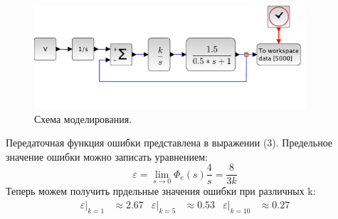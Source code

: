 \documentclass[a3paper, 11pt]{article}
\begin{document}
\begin{minipage}[t]{0.5\textwidth}
    \begin{figure}[H]
        \centering
        \includegraphics[width = 0.9\textwidth]{images/model2-2.pdf}
        \caption{Схема моделирования.}
    \end{figure}
\end{minipage}
\begin{minipage}[t]{0.5\textwidth}
    \vspace{0.5cm}
    Передаточная функция ошибки представлена в выражении (3).
    Предельное значение ошибки можно записать уравнением:
    \begin{equation}
        \varepsilon = \lim_{s\rightarrow 0}{\Phi_e(s)\frac{4}{s}} = \frac{8}{3k}
    \end{equation}
    Теперь можем получить прдельные значения ошибки при различных k:
    \begin{align*}
        \varepsilon|_{k = 1} & \approx 2.67 & \varepsilon|_{k = 5} & \approx 0.53 & \varepsilon|_{k = 10} & \approx 0.27
    \end{align*}
\end{minipage}
\end{document}
